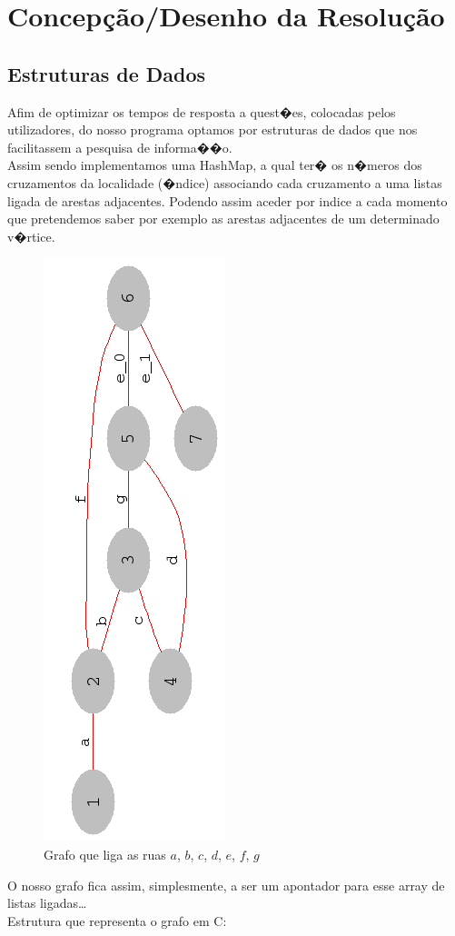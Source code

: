 \documentclass[11pt,a4paper]{article}
\newenvironment{mtc}{\secttoc\sectlof}{\pagebreak}
\begin{document}
\section{Concep\c c\~ao/Desenho da Resolu\c c\~ao}
\begin{mtc}
\subsection{Estruturas de Dados}
Afim de optimizar os tempos de resposta a quest�es, colocadas pelos utilizadores, do nosso programa optamos por estruturas
de dados que nos facilitassem a pesquisa de informa��o.
\\

Assim sendo implementamos uma \textsf{HashMap}, a qual ter� os n�meros dos cruzamentos da localidade (�ndice) associando cada cruzamento
a uma listas ligada de arestas adjacentes.
Podendo assim aceder por indice a cada momento que pretendemos saber por exemplo
as arestas adjacentes de um determinado v�rtice.
\\

\begin{figure}[!htb]\label{grafo1}
    \centering
        \includegraphics[width=.2\textwidth,angle=270]{stuff/grafo_memoria.png}
    \caption{Grafo que liga as ruas $a$, $b$, $c$, $d$, $e$, $f$, $g$}
\end{figure}

O nosso grafo fica assim, simplesmente, a ser um apontador para esse array de listas ligadas\ldots
\\

Estrutura que representa o grafo em \textsf{C}:
\lstset{language=C_ulisses}



\end{mtc}
\end{document}
